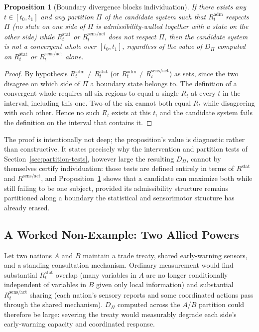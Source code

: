 \documentclass[11pt]{article}
\newtheorem{proposition}{Proposition}
\begin{document}
\begin{proposition}[Boundary divergence blocks individuation]
\label{prop:federation}
If there exists any $t\in[t_0,t_1]$ and any partition $\Pi$ of the candidate system such that $R^{\mathrm{adm}}_t$ respects $\Pi$ (no state on one side of $\Pi$ is admissibility-walled together with a state on the other side) while $R^{\mathrm{stat}}_t$ or $R^{\mathrm{sens/act}}_t$ does not respect $\Pi$, then the candidate system is not a convergent whole over $[t_0,t_1]$, regardless of the value of $D_\Pi$ computed on $R^{\mathrm{stat}}_t$ or $R^{\mathrm{sens/act}}_t$ alone.
\end{proposition}

\begin{proof}
By hypothesis $R^{\mathrm{adm}}_t \neq R^{\mathrm{stat}}_t$ (or $R^{\mathrm{adm}}_t \neq R^{\mathrm{sens/act}}_t$) as sets, since the two disagree on which side of $\Pi$ a boundary state belongs to. The definition of a convergent whole requires all six regions to equal a single $R_t$ at every $t$ in the interval, including this one. Two of the six cannot both equal $R_t$ while disagreeing with each other. Hence no such $R_t$ exists at this $t$, and the candidate system fails the definition on the interval that contains it.
\end{proof}

The proof is intentionally not deep; the proposition's value is diagnostic rather than constructive. It states precisely why the intervention and partition tests of Section~\ref{sec:partition-tests}, however large the resulting $D_\Pi$, cannot by themselves certify individuation: those tests are defined entirely in terms of $R^{\mathrm{stat}}$ and $R^{\mathrm{sens/act}}$, and Proposition~\ref{prop:federation} shows that a candidate can maximize both while still failing to be one subject, provided its admissibility structure remains partitioned along a boundary the statistical and sensorimotor structure has already erased.

\subsection{A Worked Non-Example: Two Allied Powers}

Let two nations $A$ and $B$ maintain a trade treaty, shared early-warning sensors, and a standing consultation mechanism. Ordinary measurement would find substantial $R^{\mathrm{stat}}_t$ overlap (many variables in $A$ are no longer conditionally independent of variables in $B$ given only local information) and substantial $R^{\mathrm{sens/act}}_t$ sharing (each nation's sensory reports and some coordinated actions pass through the shared mechanism). $D_\Pi$ computed across the $A$/$B$ partition could therefore be large: severing the treaty would measurably degrade each side's early-warning capacity and coordinated response.
\end{document}
